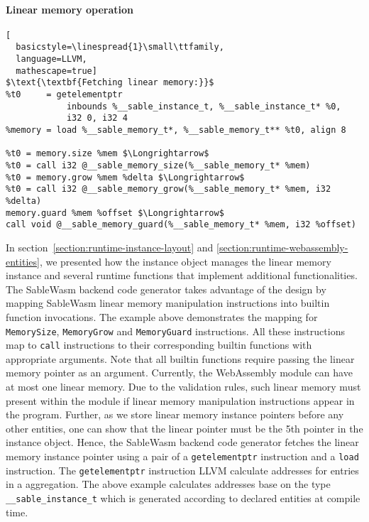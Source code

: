 \paragraph{Linear memory operation} \quad
\begin{lstlisting}[
  basicstyle=\linespread{1}\small\ttfamily, 
  language=LLVM, 
  mathescape=true]
$\text{\textbf{Fetching linear memory:}}$
%t0     = getelementptr 
            inbounds %__sable_instance_t, %__sable_instance_t* %0, 
            i32 0, i32 4
%memory = load %__sable_memory_t*, %__sable_memory_t** %t0, align 8

%t0 = memory.size %mem $\Longrightarrow$
%t0 = call i32 @__sable_memory_size(%__sable_memory_t* %mem)
%t0 = memory.grow %mem %delta $\Longrightarrow$
%t0 = call i32 @__sable_memory_grow(%__sable_memory_t* %mem, i32 %delta)
memory.guard %mem %offset $\Longrightarrow$
call void @__sable_memory_guard(%__sable_memory_t* %mem, i32 %offset)
\end{lstlisting}
In section~\ref{section:runtime-instance-layout} and
\ref{section:runtime-webassembly-entities}, we presented how the
instance object manages the linear
memory instance and several runtime functions that implement additional
functionalities. The SableWasm backend code generator takes advantage of the
design by mapping SableWasm linear memory manipulation instructions into builtin
function invocations. The example above demonstrates the mapping for
\texttt{MemorySize}, \texttt{MemoryGrow} and \texttt{MemoryGuard} instructions.
All these instructions map to \texttt{call} instructions to their corresponding
builtin functions with appropriate arguments. Note that all builtin functions
require passing the linear memory pointer as an argument. Currently, the
WebAssembly module can have at most one linear memory. Due to the validation
rules, such linear memory must present within the module if linear memory
manipulation instructions appear in the program. Further, as we store linear
memory instance pointers before any other entities, one can show that the
linear pointer must be the 5th pointer in the instance object. Hence, the
SableWasm backend code generator fetches the linear memory instance pointer
using a pair of a \texttt{getelementptr} instruction and a \texttt{load}
instruction. The \texttt{getelementptr} instruction LLVM calculate addresses
for entries in a aggregation. The above example calculates addresses base on
the type \texttt{\_\_sable\_instance\_t} which is generated according to
declared entities at compile time.

